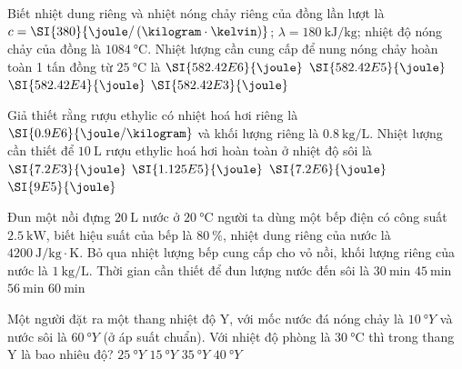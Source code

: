 \begin{ex}
Biết nhiệt dung riêng và nhiệt nóng chảy riêng của đồng lần lượt là $c =\SI{380}{\joule/\left(\kilogram\cdot\kelvin\right)}$; $\lambda =\SI{180}{\kilo\joule/\kilogram}$; nhiệt độ nóng chảy của đồng là $\SI{1084}{\celsius}$. Nhiệt lượng cần cung cấp để nung nóng chảy hoàn toàn 1 tấn đồng từ $\SI{25}{\celsius}$ là
	\choice
	{\True $\SI{582.42E6}{\joule}$}
	{$\SI{582.42E5}{\joule}$}
	{$\SI{582.42E4}{\joule}$}
	{$\SI{582.42E3}{\joule}$}
\end{ex}
\begin{ex}
Giả thiết rằng rượu ethylic có nhiệt hoá hơi riêng là $\SI{0.9E6}{\joule/\kilogram}$  và khối lượng riêng là $\SI{0.8}{\kilogram/\liter}$. Nhiệt lượng cần thiết để $\SI{10}{\liter}$ rượu ethylic hoá hơi hoàn toàn ở nhiệt độ sôi là	
	\choice
	{$\SI{7.2E3}{\joule}$}
	{$\SI{1.125E5}{\joule}$}
	{$\SI{7.2E6}{\joule}$}
	{$\SI{9E5}{\joule}$}
\end{ex}
\begin{ex}
	Đun một nồi đựng $\SI{20}{\liter}$ nước ở $\SI{20}{\celsius}$ người ta dùng một bếp điện có công suất $\SI{2.5}{\kilo\watt}$, biết hiệu suất của bếp là $\SI{80}{\percent}$, nhiệt dung riêng của nước là $\SI{4200}{\joule/\kilogram\cdot\kelvin}$. Bỏ qua nhiệt lượng bếp cung cấp cho vỏ nồi, khối lượng riêng của nước là $\SI{1}{\kilogram/\liter}$. Thời gian cần thiết để đun lượng nước đến sôi là
	\choice
	{$\SI{30}{\minute}$}
	{$\SI{45}{\minute}$}
	{$\SI{56}{\minute}$}
	{$\SI{60}{\minute}$}
\end{ex}
\begin{ex}
	Một người đặt ra một thang nhiệt độ Y, với mốc nước đá nóng chảy là $\SI{10}{\degree Y}$ và nước sôi là $\SI{60}{\degree Y}$ (ở áp suất chuẩn). Với nhiệt độ phòng là $\SI{30}{\celsius}$ thì trong thang Y là bao nhiêu độ?
	\choice
	{\True $\SI{25}{\degree Y}$}
	{$\SI{15}{\degree Y}$}
	{$\SI{35}{\degree Y}$}
	{$\SI{40}{\degree Y}$}
\end{ex}

